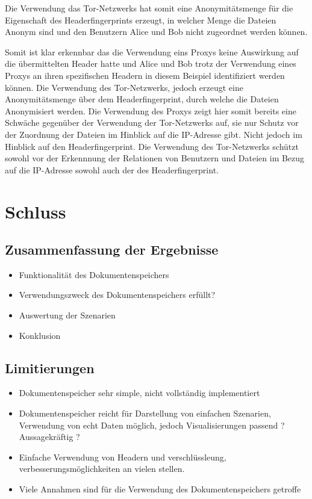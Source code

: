 \documentclass[
    fontsize=12pt,
    headings=small,
    parskip=half,           %
    bibliography=totoc,
    numbers=noenddot,       %
    open=any,               %
    ]{scrreprt}
\begin{document}
Die Verwendung das Tor-Netzwerks hat somit eine Anonymitätsmenge für die Eigenschaft des Headerfingerprints erzeugt, in welcher Menge die Dateien Anonym sind und den Benutzern Alice und Bob nicht zugeordnet werden können.

Somit ist klar erkennbar das die Verwendung eins Proxys keine Auswirkung auf die übermittelten Header hatte und Alice und Bob trotz der Verwendung eines Proxys an ihren spezifischen Headern in diesem Beispiel identifiziert werden können.
Die Verwendung des Tor-Netzwerks, jedoch erzeugt eine Anonymitätsmenge über dem Headerfingerprint, durch welche die Dateien Anonymisiert werden.
Die Verwendung des Proxys zeigt hier somit bereits eine Schwäche gegenüber der Verwendung der Tor-Netzwerks auf, sie nur Schutz vor der Zuordnung der Dateien im Hinblick auf die IP-Adresse gibt.
Nicht jedoch im Hinblick auf den Headerfingerprint.
Die Verwendung des Tor-Netzwerks schützt sowohl vor der Erkennnung der Relationen von Benutzern und Dateien im Bezug auf die IP-Adresse sowohl auch der des Headerfingerprint.


\chapter{Schluss}
\section{Zusammenfassung der Ergebnisse}
\begin{itemize}
\item Funktionalität des Dokumentenspeichers
\item Verwendungszweck des Dokumentenspeichers erfüllt?
\item Auswertung der Szenarien
\item Konklusion
\end{itemize}

\section{Limitierungen}
\begin{itemize}
\item Dokumentenspeicher sehr simple, nicht vollständig implementiert
\item Dokumentenspeicher reicht für Darstellung von einfachen Szenarien, Verwendung von echt Daten möglich, jedoch Visualisierungen passend ? Aussagekräftig ?
\item Einfache Verwendung von Headern und verschlüssleung, verbesserungsmöglichkeiten an vielen stellen.
\item Viele Annahmen sind für die Verwendung des Dokumentenspeichers getroffe
\end{itemize}
\end{document}
